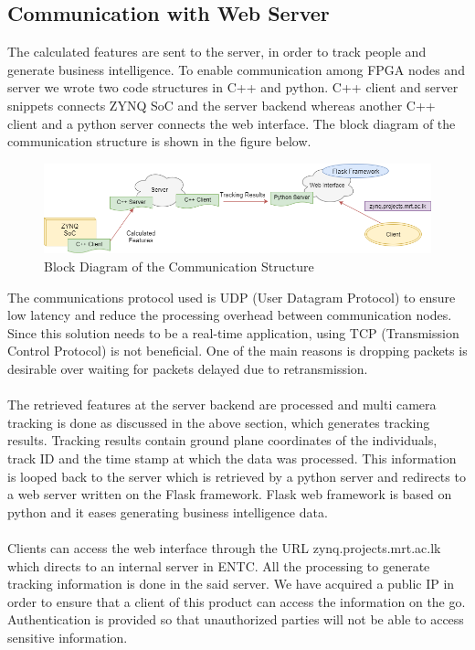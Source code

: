 \documentclass[12pt,a4paper]{report}
\begin{document}
\subsection{Communication with Web Server}
The calculated features are sent to the server, in order to track people and generate business intelligence. To enable communication among FPGA nodes and server we wrote two code structures in C++ and python. C++ client and server snippets connects ZYNQ SoC and the server backend whereas another C++ client and a python server connects the web interface. The block diagram of the communication structure is shown in the figure below.
\begin{figure}[H]
\includegraphics[width=\textwidth]{comm.png}
\centering
\caption{Block Diagram of the Communication Structure}
\label{flask}
\end{figure}
The communications protocol used is UDP (User Datagram Protocol) to ensure low latency and reduce the processing overhead between communication nodes. Since this solution needs to be a real-time application, using TCP (Transmission Control Protocol) is not beneficial. One of the main reasons is dropping packets is desirable over waiting for packets delayed due to retransmission.\\\\
The retrieved features at the server backend are processed and multi camera tracking is done as discussed in the above section, which generates tracking results. Tracking results contain ground plane coordinates of the individuals, track ID and the time stamp at which the data was processed. This information is looped back to the server which is retrieved by a python server and redirects to a web server written on the Flask framework. Flask web framework is based on python and it eases generating business intelligence data.\\\\
Clients can access the web interface through the URL zynq.projects.mrt.ac.lk which directs to an internal server in ENTC. All the processing to generate tracking information is done in the said server. We have acquired a public IP in order to ensure that a client of this product can access the information on the go. Authentication is provided so that unauthorized parties will not be able to access sensitive information.
\end{document}
